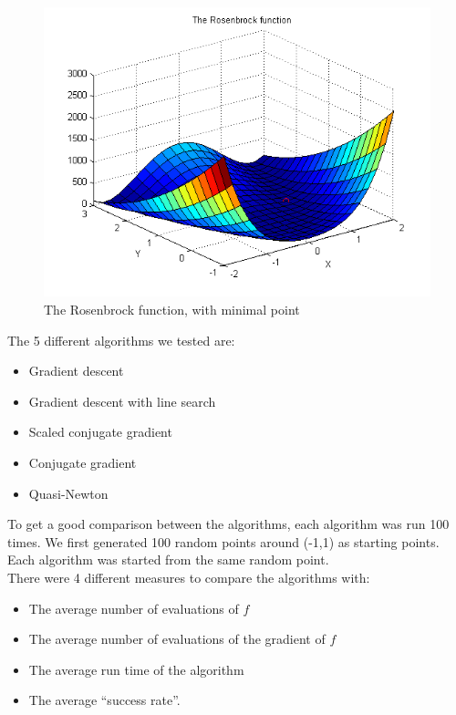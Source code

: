 \documentclass{article}
\begin{document}
\begin{figure}[H]
	\centering
		\includegraphics[scale=0.8]{rosenbrock.png}
	\caption{The Rosenbrock function, with minimal point}
	\label{fig:rosenbrock}
\end{figure}

The 5 different algorithms we tested are:
\begin{itemize}
\item Gradient descent
\item Gradient descent with line search
\item Scaled conjugate gradient
\item Conjugate gradient
\item Quasi-Newton
\end{itemize}

To get a good comparison between the algorithms, each algorithm was run 100 times.
We first generated 100 random points around (-1,1) as starting points. Each algorithm was started from the same random point.\\

\newpage
There were 4 different measures to compare the algorithms with:
\begin{itemize}
\item The average number of evaluations of $f$
\item The average number of evaluations of the gradient of $f$
\item The average run time of the algorithm
\item The average ``success rate''. 
\end{itemize}
\end{document}
